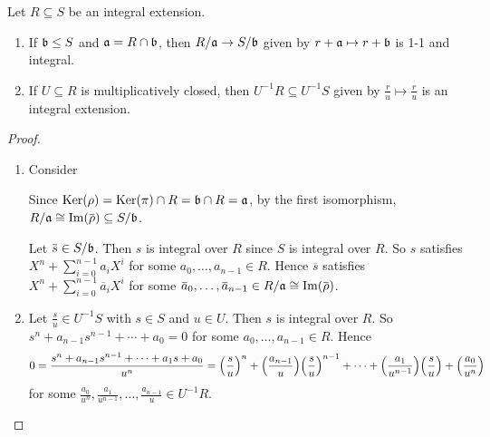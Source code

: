 \begin{proposition}\label{5.22}
    Let $R \subseteq S$ be an integral extension.
    \begin{enumerate}
        \item\label{5.22a} If $\mathfrak{b} \leq S$ and $\mathfrak{a} = R \cap \mathfrak{b}$, then $R/\mathfrak{a} \to S/\mathfrak{b}$ given by $r+\mathfrak{a} \mapsto r+\mathfrak{b}$ is 1-1 and integral. 
        \item\label{5.22b} If $U \subseteq R$ is multiplicatively closed, then $U^{-1}R \subseteq U^{-1}S$ given by $\frac{r}{u} \mapsto \frac{r}{u}$ is an integral extension.
    \end{enumerate}
\end{proposition}

\begin{proof}
    \begin{enumerate}
        \item Consider
            \begin{center}
            \end{center}
            Since $\operatorname{Ker}(\rho) = \operatorname{Ker}(\pi) \cap R = \mathfrak{b} \cap R = \mathfrak{a}$, by the first isomorphism, $R/\ffa \cong \im(\overbar{\rho}) \subseteq S/\ffb$. \par 
            Let $\overbar{s} \in S/\ffb$. Then $s$ is integral over $R$ since $S$ is integral over $R$. So $s$ satisfies $X^{n} + \sum_{i=0}^{n-1}a_iX^{i}$ for some $a_0,\ldots,a_{n-1} \in R$. Hence $\overbar{s}$ satisfies $X^{n} + \sum_{i=0}^{n-1} \overbar{a}_iX^{i}$ for some $\overbar{a}_0,\ldots,\overbar{a}_{n-1} \in R/\ffa \cong \im(\overbar{\rho})$.
        \item Let $\frac{s}{u} \in U^{-1}S$ with $s \in S$ and $u \in U$. Then $s$ is integral over $R$. So $s^{n} + a_{n-1}s^{n-1} + \cdots + a_0 = 0$ for some $a_0,\ldots,a_{n-1} \in R$. Hence 
            \[0 = \frac{s^{n}+a_{n-1}s^{n-1} + \cdots + a_1s + a_0}{u^{n}} = \Bigl(\frac{s}{u}\Bigr)^{n} + \Bigl(\frac{a_{n-1}}{u}\Bigr)\Bigl(\frac{s}{u}\Bigr)^{n-1} + \cdots + \Bigl(\frac{a_1}{u^{n-1}}\Bigr)\Bigl(\frac{s}{u}\Bigr) + \Bigl(\frac{a_0}{u^{n}}\Bigr)\] 
            for some $\frac{a_0}{u^{n}},\frac{a_1}{u^{n-1}},\ldots,\frac{a_{n-1}}{u} \in U^{-1}R$. \qedhere
    \end{enumerate}
\end{proof}


